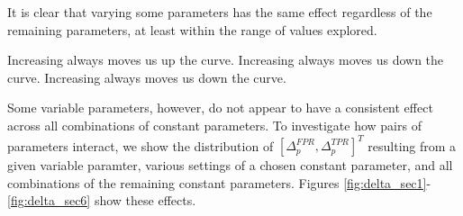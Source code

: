 
It is clear that varying some parameters has the same effect regardless of the
remaining parameters, at least within the range of values explored. 



Increasing  always moves us up the curve.
Increasing  always moves us down the curve.
Increasing  always moves us down the curve.

\clearpage
Some variable parameters, however, do not appear to have a consistent effect
across all combinations of constant parameters. To investigate how pairs of
parameters interact, we show the distribution of $[\Delta_p^{FPR},
  \Delta_p^{TPR}]^T$ resulting from a given variable paramter, various settings
of a chosen constant parameter, and all combinations of the remaining constant
parameters. Figures \ref{fig:delta_sec1}-\ref{fig:delta_sec6} show these
effects.

